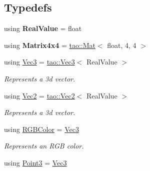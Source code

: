 \subsection*{Typedefs}
\begin{DoxyCompactItemize}
\item 
\mbox{\label{namespaceomg_ae1f923770ca854087fb3542f132ea030}} 
using {\bfseries Real\+Value} = float
\item 
\mbox{\label{namespaceomg_ab3d81ffc3dbfbc597da7114c35c36d23}} 
using {\bfseries Matrix4x4} = \mbox{\hyperlink{classtao_1_1_mat}{tao\+::\+Mat}}$<$ float, 4, 4 $>$
\item 
\mbox{\label{namespaceomg_a45a9482677fee9933ff369b49894e316}} 
using \mbox{\hyperlink{namespaceomg_a45a9482677fee9933ff369b49894e316}{Vec3}} = \mbox{\hyperlink{namespacetao_ae482eac12cddc119b58d00c3cd25473e}{tao\+::\+Vec3}}$<$ Real\+Value $>$
\begin{DoxyCompactList}\small\item\em Represents a 3d vector. \end{DoxyCompactList}\item 
\mbox{\label{namespaceomg_aefe4804ccbaed61b5dd699b449b31150}} 
using \mbox{\hyperlink{namespaceomg_aefe4804ccbaed61b5dd699b449b31150}{Vec2}} = \mbox{\hyperlink{namespacetao_a7c689316b82c94e7228f42ac874a548b}{tao\+::\+Vec2}}$<$ Real\+Value $>$
\begin{DoxyCompactList}\small\item\em Represents a 3d vector. \end{DoxyCompactList}\item 
\mbox{\label{namespaceomg_a7b0e3f3dcf76f2b4758c314a41885917}} 
using \mbox{\hyperlink{namespaceomg_a7b0e3f3dcf76f2b4758c314a41885917}{R\+G\+B\+Color}} = \mbox{\hyperlink{namespaceomg_a45a9482677fee9933ff369b49894e316}{Vec3}}
\begin{DoxyCompactList}\small\item\em Represents an R\+GB color. \end{DoxyCompactList}\item 
\mbox{\label{namespaceomg_af85242d35fdacf829d32a6f9b95f3e35}} 
using \mbox{\hyperlink{namespaceomg_af85242d35fdacf829d32a6f9b95f3e35}{Point3}} = \mbox{\hyperlink{namespaceomg_a45a9482677fee9933ff369b49894e316}{Vec3}}

\end{DoxyCompactItemize}
